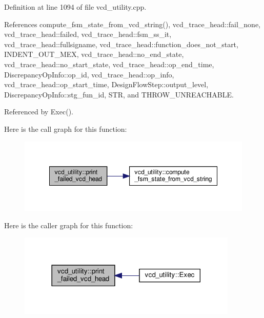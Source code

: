 Definition at line 1094 of file vcd\+\_\+utility.\+cpp.



References compute\+\_\+fsm\+\_\+state\+\_\+from\+\_\+vcd\+\_\+string(), vcd\+\_\+trace\+\_\+head\+::fail\+\_\+none, vcd\+\_\+trace\+\_\+head\+::failed, vcd\+\_\+trace\+\_\+head\+::fsm\+\_\+ss\+\_\+it, vcd\+\_\+trace\+\_\+head\+::fullsigname, vcd\+\_\+trace\+\_\+head\+::function\+\_\+does\+\_\+not\+\_\+start, I\+N\+D\+E\+N\+T\+\_\+\+O\+U\+T\+\_\+\+M\+EX, vcd\+\_\+trace\+\_\+head\+::no\+\_\+end\+\_\+state, vcd\+\_\+trace\+\_\+head\+::no\+\_\+start\+\_\+state, vcd\+\_\+trace\+\_\+head\+::op\+\_\+end\+\_\+time, Discrepancy\+Op\+Info\+::op\+\_\+id, vcd\+\_\+trace\+\_\+head\+::op\+\_\+info, vcd\+\_\+trace\+\_\+head\+::op\+\_\+start\+\_\+time, Design\+Flow\+Step\+::output\+\_\+level, Discrepancy\+Op\+Info\+::stg\+\_\+fun\+\_\+id, S\+TR, and T\+H\+R\+O\+W\+\_\+\+U\+N\+R\+E\+A\+C\+H\+A\+B\+LE.



Referenced by Exec().

Here is the call graph for this function\+:
\nopagebreak
\begin{figure}[H]
\begin{center}
\leavevmode
\includegraphics[width=348pt]{d8/d51/classvcd__utility_a9ff21c0bde72b02cd81bd7443eba6353_cgraph}
\end{center}
\end{figure}
Here is the caller graph for this function\+:
\nopagebreak
\begin{figure}[H]
\begin{center}
\leavevmode
\includegraphics[width=297pt]{d8/d51/classvcd__utility_a9ff21c0bde72b02cd81bd7443eba6353_icgraph}
\end{center}
\end{figure}
\mbox{\label{classvcd__utility_a5ca871239e451e2e15f8866dfcf2558d}} 
